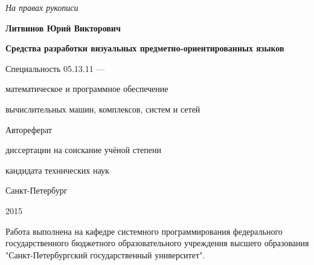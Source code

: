 \newcommand{\sfs}{\fontsize{10pt}{10pt}\selectfont}
\sfs %
\thispagestyle{empty}

\vspace{10mm}
\begin{flushright}
  \Large\textit{На правах рукописи}
\end{flushright}

\vspace{25mm}
\begin{center}
  \Large\bf{Литвинов Юрий Викторович}
\end{center}

\vspace{20mm}
\begin{center}
  {\bf \LARGE Средства разработки визуальных предметно-ориентированных языков
\par}

\vspace{20mm}
{\Large
Специальность 05.13.11 ---\par
математическое и программное обеспечение\par
вычислительных машин, комплексов, систем и сетей
}

\vspace{15mm}
\LARGE Автореферат\par
\Large{диссертации на соискание учёной степени\par
кандидата технических наук}
\end{center}

\vspace{35mm}
\begin{center}
  \Large{Санкт-Петербург\par 2015}
\end{center}

\newpage
\thispagestyle{empty}

\small{
Работа выполнена на кафедре системного программирования федерального государственного
бюджетного образовательного учреждения высшего образования "Санкт-Петербургский
государственный университет".
}

